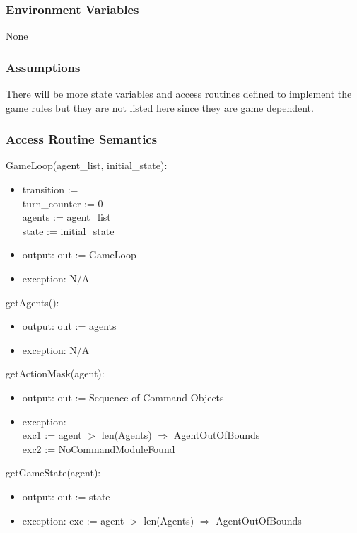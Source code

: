 \documentclass[12pt, titlepage]{article}
\begin{document}
\subsubsection{Environment Variables}
None

\subsubsection{Assumptions}
There will be more state variables and access routines defined to implement the game rules but they are not listed here since they are game dependent.

\subsubsection{Access Routine Semantics}

\noindent GameLoop(agent\_list, initial\_state):
\begin{itemize}
\item transition :=\\
turn\_counter := 0\\
agents := agent\_list\\
state := initial\_state
\item output: out := GameLoop
\item exception: N/A
\end{itemize}

\noindent getAgents():
\begin{itemize}
\item output: out := agents
\item exception: N/A
\end{itemize}

\noindent getActionMask(agent):
\begin{itemize}
\item output: out := Sequence of Command Objects
\item exception: \\
exc1 := agent $>$ len(Agents) $\Rightarrow$ AgentOutOfBounds \\
exc2 := NoCommandModuleFound
\end{itemize}

\noindent getGameState(agent):
\begin{itemize}
\item output: out := state
\item exception: exc := agent $>$ len(Agents) $\Rightarrow$ AgentOutOfBounds
\end{itemize}
\end{document}
